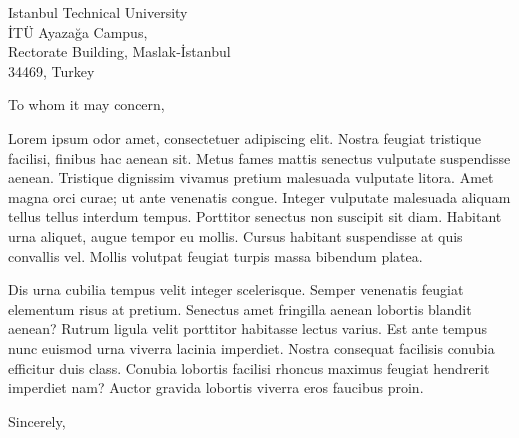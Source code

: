 \documentclass[11pt]{ituletter}
\date{September 20, 202X} %
\begin{document}
\begin{letter}{Istanbul Technical University\\ 
               İTÜ Ayazağa Campus,\\ Rectorate Building, Maslak-İstanbul\\ 
               34469, Turkey}

\opening{To whom it may concern,}

Lorem ipsum odor amet, consectetuer adipiscing elit. Nostra feugiat tristique facilisi, finibus hac aenean sit. Metus fames mattis senectus vulputate suspendisse aenean. Tristique dignissim vivamus pretium malesuada vulputate litora. Amet magna orci curae; ut ante venenatis congue. Integer vulputate malesuada aliquam tellus tellus interdum tempus. Porttitor senectus non suscipit sit diam. Habitant urna aliquet, augue tempor eu mollis. Cursus habitant suspendisse at quis convallis vel. Mollis volutpat feugiat turpis massa bibendum platea.

Dis urna cubilia tempus velit integer scelerisque. Semper venenatis feugiat elementum risus at pretium. Senectus amet fringilla aenean lobortis blandit aenean? Rutrum ligula velit porttitor habitasse lectus varius. Est ante tempus nunc euismod urna viverra lacinia imperdiet. Nostra consequat facilisis conubia efficitur duis class. Conubia lobortis facilisi rhoncus maximus feugiat hendrerit imperdiet nam? Auctor gravida lobortis viverra eros faucibus proin.

\closing{Sincerely,}

\end{letter}
\end{document}
